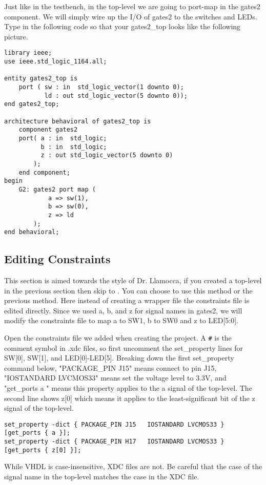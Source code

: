 Just like in the testbench, in the top-level we are going to port-map in the gates2 component.
We will simply wire up the I/O of gates2 to the switches and LEDs.
Type in the following code so that your gates2\_top looks like the following picture.

\begin{center}
\begin{minipage}{\textwidth}
\begin{verbatim}
library ieee;
use ieee.std_logic_1164.all;

entity gates2_top is
    port ( sw : in  std_logic_vector(1 downto 0);
           ld : out std_logic_vector(5 downto 0));
end gates2_top;

architecture behavioral of gates2_top is
    component gates2
    port( a : in  std_logic;
          b : in  std_logic;
          z : out std_logic_vector(5 downto 0)
        );
    end component;
begin
    G2: gates2 port map (
            a => sw(1),
            b => sw(0),
            z => ld
        );
end behavioral;
\end{verbatim}
\end{minipage}
\end{center}

\subsection{Editing Constraints}
\label{sec:constraints}
This section is aimed towards the style of Dr. Llamocca, if you created a top-level in the
previous section then skip to .
You can choose to use this method or the previous  method.
Here instead of creating a wrapper file the constraints file is edited directly.
Since we used a, b, and z for signal names in gates2, we will modify the constraints file to
map a to SW1, b to SW0 and z to LED[5:0].

Open the constraints file we added when creating the project.
A \verb|#| is the comment symbol in .xdc files, so first uncomment the set\_property lines
for SW[0], SW[1], and LED[0]-LED[5].
Breaking down the first set\_property command below, "PACKAGE\_PIN J15" means connect to pin
J15, "IOSTANDARD LVCMOS33" means set the voltage level to 3.3V, and "get\_ports { a }" means
this property applies to the a signal of the top-level.
The second line shows z[0] which means it applies to the least-significant bit of the z signal of
the top-level.

\begin{verbatim}
set_property -dict { PACKAGE_PIN J15   IOSTANDARD LVCMOS33 } [get_ports { a }];
set_property -dict { PACKAGE_PIN H17   IOSTANDARD LVCMOS33 } [get_ports { z[0] }];
\end{verbatim}

\begin{mdframed}[style=note]
    While VHDL is case-insensitive, XDC files are not.
    Be careful that the case of the signal name in the top-level matches the case in the XDC file.
\end{mdframed}

